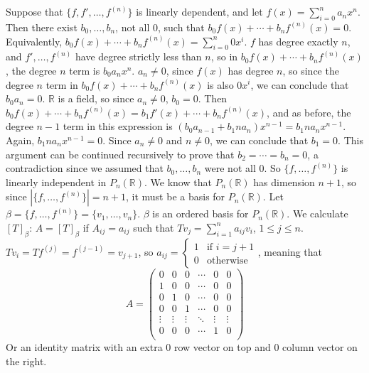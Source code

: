 \documentclass[11pt]{article}
\begin{document}
\renewcommand{\thesubsection}{\thesection.\alph{subsection}}


\section{} %
Suppose that $\{f,f',\ldots,f^{(n)}\}$ is linearly dependent, and let
$f(x)=\sum_{i=0}^na_nx^n$. Then there exist $b_0,\ldots,b_n$, not all 0,  such
that $b_0f(x)+\cdots+b_nf^{(n)}(x)=0$.  Equivalently,
$b_0f(x)+\cdots+b_nf^{(n)}(x)=\sum_{i=0}^n0x^i$. $f$ has degree exactly $n$,
and $f',\ldots,f^{(n)}$ have degree strictly less than $n$, so in
$b_0f(x)+\cdots+b_nf^{(n)}(x)$, the degree $n$ term is $b_0a_nx^n$.
$a_n\neq0$, since $f(x)$ has degree $n$, so since the degree $n$ term in
$b_0f(x)+\cdots+b_nf^{(n)}(x)$ is also $0x^i$, we can conclude that
$b_0a_n=0$.  $\mathbb{R}$ is a field, so since $a_n\neq0$, $b_0=0$. Then
$b_0f(x)+\cdots+b_nf^{(n)}(x)=b_1f'(x)+\cdots+b_nf^{(n)}(x)$, and as before,
the degree $n-1$ term in this expression is
$(b_0a_{n-1}+b_1na_n)x^{n-1}=b_1na_nx^{n-1}$. Again, $b_1na_nx^{n-1}=0$. Since
$a_n\neq0$ and $n\neq0$, we can conclude that $b_1=0$. This argument can be
continued recursively to prove that $b_2=\cdots=b_n=0$, a contradiction since
we assumed that $b_0,\ldots,b_n$ were not all 0. So $\{f,\ldots,f^{(n)}\}$ is
linearly independent in $P_n(\mathbb{R})$. We know that $P_n(\mathbb{R})$ has
dimension $n+1$, so since $|\{f,\ldots,f^{(n)}\}|=n+1$, it must be a basis for
$P_n(\mathbb{R})$.
\newline
\newline
Let $\beta=\{f,\ldots,f^{(n)}\}=\{v_1,\ldots,v_n\}$. $\beta$ is an ordered
basis for $P_n(\mathbb{R})$. We calculate $[T]_\beta$:
\newline
\newline
$A=[T]_\beta$ if $A_{ij}=a_{ij}$ such that
$Tv_j=\sum_{i=1}^na_{ij}v_i$, $1\le j\le n$.
$Tv_i=Tf^{(j)}=f^{(j-1)}=v_{j+1}$, so $a_{ij}=\begin{cases}
	1 & \text{if $i=j+1$}\\
	0 & \text{otherwise}
\end{cases}$, meaning that
\[A=\begin{pmatrix}
	0 & 0 & 0 & \cdots & 0 & 0\\
	1 & 0 & 0 & \cdots & 0 & 0\\
	0 & 1 & 0 & \cdots & 0 & 0\\
	0 & 0 & 1 & \cdots & 0 & 0\\
	\vdots & \vdots & \vdots & \ddots & \vdots & \vdots\\
	0 & 0 & 0 & \cdots &  1 & 0\\
\end{pmatrix}\]
Or an identity matrix with an extra 0 row vector on top and 0 column vector on
the right.
\end{document}
